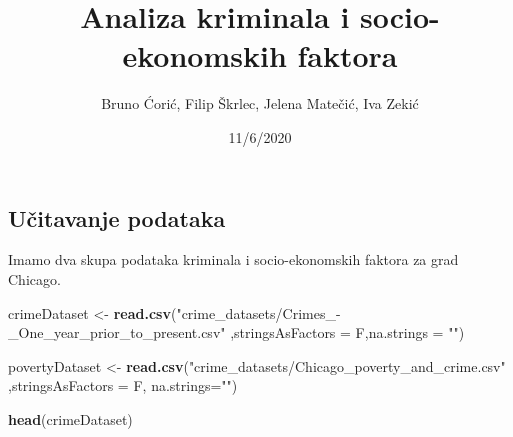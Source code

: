 \documentclass[
]{article}
\title{Analiza kriminala i socio-ekonomskih faktora}
\author{Bruno Ćorić, Filip Škrlec, Jelena Matečić, Iva Zekić}
\date{11/6/2020}
\newenvironment{Shaded}{\begin{snugshade}}{\end{snugshade}}
\newcommand{\DataTypeTok}[1]{\textcolor[rgb]{0.13,0.29,0.53}{#1}}
\newcommand{\KeywordTok}[1]{\textcolor[rgb]{0.13,0.29,0.53}{\textbf{#1}}}
\newcommand{\NormalTok}[1]{#1}
\newcommand{\StringTok}[1]{\textcolor[rgb]{0.31,0.60,0.02}{#1}}
\begin{document}
\maketitle

\hypertarget{uux10ditavanje-podataka}{%
\subsection{Učitavanje podataka}\label{uux10ditavanje-podataka}}

Imamo dva skupa podataka kriminala i socio-ekonomskih faktora za grad
Chicago.

\begin{Shaded}
\begin{Highlighting}[]
\NormalTok{crimeDataset <-}\StringTok{ }\KeywordTok{read.csv}\NormalTok{(}\StringTok{"crime_datasets/Crimes_-_One_year_prior_to_present.csv"}
\NormalTok{                         ,}\DataTypeTok{stringsAsFactors =}\NormalTok{ F,}\DataTypeTok{na.strings =} \StringTok{""}\NormalTok{)}

\NormalTok{povertyDataset <-}\StringTok{ }\KeywordTok{read.csv}\NormalTok{(}\StringTok{"crime_datasets/Chicago_poverty_and_crime.csv"}
\NormalTok{                           ,}\DataTypeTok{stringsAsFactors =}\NormalTok{ F, }\DataTypeTok{na.strings=}\StringTok{""}\NormalTok{)}

\KeywordTok{head}\NormalTok{(crimeDataset)}
\end{Highlighting}
\end{Shaded}
\end{document}
